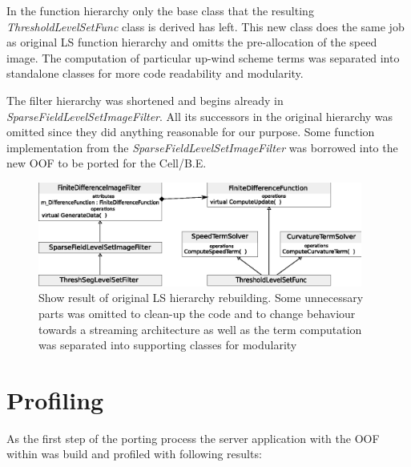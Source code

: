 \par
In the function hierarchy only the base class that the resulting \mbox{\emph{ThresholdLevelSetFunc}} class is derived has left.
This new class does the same job as original LS function hierarchy and omitts the pre-allocation of the speed image.
The computation of particular up-wind scheme terms was separated into standalone classes for more code readability and modularity.

\par
The filter hierarchy was shortened and begins already in \mbox{\emph{SparseFieldLevelSetImageFilter}}.
All its successors in the original hierarchy was omitted since they did anything reasonable for our purpose.
Some function implementation from the \mbox{\emph{SparseFieldLevelSetImageFilter}} was borrowed into the new OOF to be ported for the \mbox{Cell/B.E.}

\begin{figure}
    \centering
    \includegraphics[width=0.95\textwidth]{data/resultingFilter}
    \caption[Resulting level set filter ready to be ported to \mbox{Cell/B.E.}]
    {
Show result of original LS hierarchy rebuilding.
Some unnecessary parts was omitted to clean-up the code and to change behaviour towards a streaming architecture as well as the term computation was separated into supporting classes for modularity
    }
    \label{fg:resultingFilter}
\end{figure}

\section{Profiling}

As the first step of the porting process the server application with the OOF within was build and profiled with following results:

